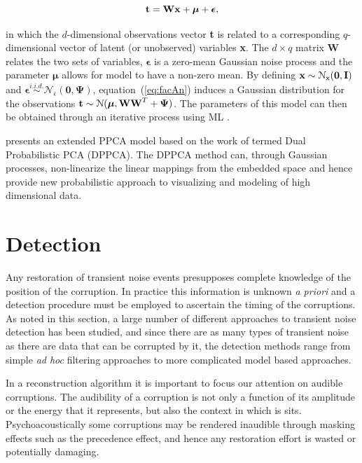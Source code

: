 \begin{equation}\label{eq:facAn}
\textrm{\textbf{t}} = \textrm{\textbf{W}}\textrm{\textbf{x}} + \boldsymbol\mu + \boldsymbol\epsilon,
\end{equation}

in which the $d$-dimensional observations vector \textbf{t} is related to a corresponding $q$-dimensional vector of latent (or unobserved) variables \textbf{x}. The $d \times q$ matrix \textbf{W} relates the two sets of variables, $\boldsymbol\epsilon$ is a zero-mean Gaussian noise process and the parameter $\boldsymbol\mu$ allows for model to have a non-zero mean. By defining $\textrm{\textbf{x}} \sim \mathcal{N}_\textrm{x}(\boldsymbol0,\textrm{\textbf{I}})$ and $\boldsymbol\epsilon \stackrel{i.i.d.}{\sim} \mathcal{N}_\epsilon(\boldsymbol0,\boldsymbol\Psi)$, equation~(\ref{eq:facAn}) induces a Gaussian distribution for the observations $\textrm{\textbf{t}} \sim \mathcal{N}(\boldsymbol\mu,\textrm{\textbf{W}}\textrm{\textbf{W}}^T + \boldsymbol\Psi)$. The parameters of this model can then be obtained through an iterative process using ML \citep{Tipping1999}.

\cite{Lawrence2005} presents an extended PPCA model based on the work of \cite{Tipping1999} termed Dual Probabilistic PCA (DPPCA). The DPPCA method can, through Gaussian processes, non-linearize the linear mappings from the embedded space and hence provide new probabilistic approach to visualizing and modeling of high dimensional data.

\section{Detection}\label{sec:LitRev_Detection}
Any restoration of transient noise events presupposes complete knowledge of the position of the corruption. In practice this information is unknown \emph{a priori} and a detection procedure must be employed to ascertain the timing of the corruptions. As noted in this section, a large number of different approaches to transient noise detection has been studied, and since there are as many types of transient noise as there are data that can be corrupted by it, the detection methods range from simple \emph{ad hoc} filtering approaches to more complicated model based approaches.

In a reconstruction algorithm it is important to focus our attention on audible corruptions. The audibility of a corruption is not only a function of its amplitude or the energy that it represents, but also the context in which is sits. Psychoacoustically some corruptions may be rendered inaudible through masking effects such as the precedence effect, and hence any restoration effort is wasted or potentially damaging.

